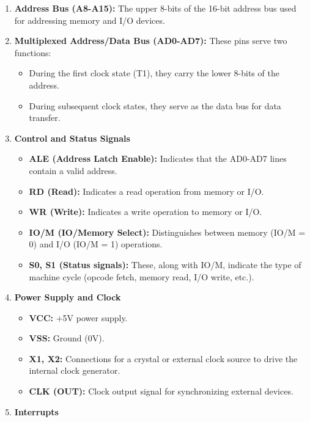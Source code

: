 \documentclass[
]{article}
\begin{document}
\begin{enumerate}
\def\labelenumi{\arabic{enumi}.}
\item
  \textbf{Address Bus (A8-A15):} The upper 8-bits of the 16-bit address
  bus used for addressing memory and I/O devices.
\item
  \textbf{Multiplexed Address/Data Bus (AD0-AD7):} These pins serve two
  functions:

  \begin{itemize}
  \item
    During the first clock state (T1), they carry the lower 8-bits of
    the address.
  \item
    During subsequent clock states, they serve as the data bus for data
    transfer.
  \end{itemize}
\item
  \textbf{Control and Status Signals}

  \begin{itemize}
  \item
    \textbf{ALE (Address Latch Enable):} Indicates that the AD0-AD7
    lines contain a valid address.
  \item
    \textbf{RD (Read):} Indicates a read operation from memory or I/O.
  \item
    \textbf{WR (Write):} Indicates a write operation to memory or I/O.
  \item
    \textbf{IO/M (IO/Memory Select):} Distinguishes between memory (IO/M
    = 0) and I/O (IO/M = 1) operations.
  \item
    \textbf{S0, S1 (Status signals):} These, along with IO/M, indicate
    the type of machine cycle (opcode fetch, memory read, I/O write,
    etc.).
  \end{itemize}
\item
  \textbf{Power Supply and Clock}

  \begin{itemize}
  \item
    \textbf{VCC:} +5V power supply.
  \item
    \textbf{VSS:} Ground (0V).
  \item
    \textbf{X1, X2:} Connections for a crystal or external clock source
    to drive the internal clock generator.
  \item
    \textbf{CLK (OUT):} Clock output signal for synchronizing external
    devices.
  \end{itemize}
\item
  \textbf{Interrupts}


\end{enumerate}
\end{document}
